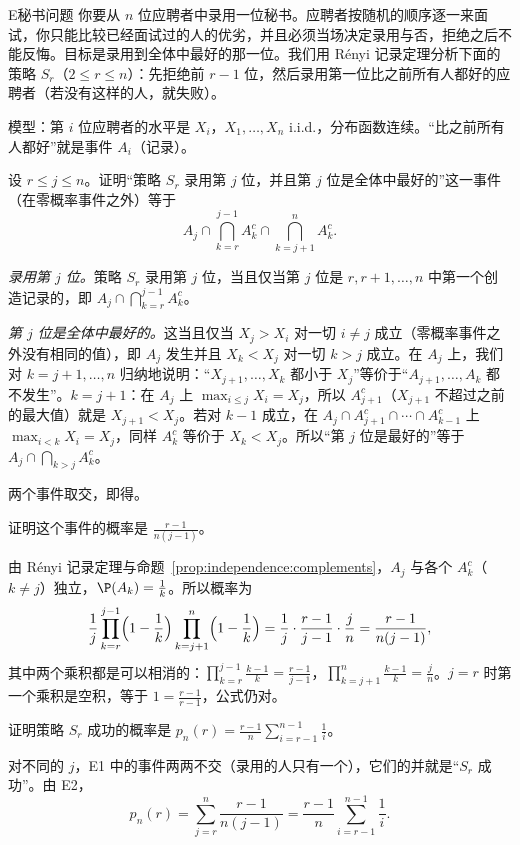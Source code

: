 
\begin{probleme}{E}{秘书问题}
你要从 $n$ 位应聘者中录用一位秘书。应聘者按随机的顺序逐一来面试，你只能比较已经面试过的人的优劣，并且必须当场决定录用与否，拒绝之后不能反悔。目标是录用到全体中最好的那一位。我们用 Rényi 记录定理分析下面的策略 $S_r$（$2\leqslant r\leqslant n$）：先拒绝前 $r-1$ 位，然后录用第一位比之前所有人都好的应聘者（若没有这样的人，就失败）。

模型：第 $i$ 位应聘者的水平是 $X_i$，$X_1,\dots,X_n$ i.i.d.，分布函数连续。“比之前所有人都好”就是事件 $A_i$（记录）。
\begin{questions}
\item 设 $r\leqslant j\leqslant n$。证明“策略 $S_r$ 录用第 $j$ 位，并且第 $j$ 位是全体中最好的”这一事件（在零概率事件之外）等于
\[
A_j\cap\bigcap_{k=r}^{j-1}A_k^c\cap\bigcap_{k=j+1}^nA_k^c .
\]
\begin{solution}
\emph{录用第 $j$ 位。}策略 $S_r$ 录用第 $j$ 位，当且仅当第 $j$ 位是 $r,r+1,\dots,n$ 中第一个创造记录的，即 $A_j\cap\bigcap_{k=r}^{j-1}A_k^c$。

\emph{第 $j$ 位是全体中最好的。}这当且仅当 $X_j>X_i$ 对一切 $i\neq j$ 成立（零概率事件之外没有相同的值），即 $A_j$ 发生并且 $X_k<X_j$ 对一切 $k>j$ 成立。在 $A_j$ 上，我们对 $k=j+1,\dots,n$ 归纳地说明：“$X_{j+1},\dots,X_k$ 都小于 $X_j$”等价于“$A_{j+1},\dots,A_k$ 都不发生”。$k=j+1$：在 $A_j$ 上 $\max_{i\leqslant j}X_i=X_j$，所以 $A_{j+1}^c$（$X_{j+1}$ 不超过之前的最大值）就是 $X_{j+1}<X_j$。若对 $k-1$ 成立，在 $A_j\cap A_{j+1}^c\cap\cdots\cap A_{k-1}^c$ 上 $\max_{i<k}X_i=X_j$，同样 $A_k^c$ 等价于 $X_k<X_j$。所以“第 $j$ 位是最好的”等于 $A_j\cap\bigcap_{k>j}A_k^c$。

两个事件取交，即得。
\end{solution}

\item 证明这个事件的概率是 $\frac{r-1}{n(j-1)}$。
\begin{solution}
由 Rényi 记录定理与命题~\ref{prop:independence:complements}，$A_j$ 与各个 $A_k^c$（$k\neq j$）独立，$\P(A_k)=\frac1k$。所以概率为
\[
\frac1j\prod_{k=r}^{j-1}\Bigl(1-\frac1k\Bigr)\prod_{k=j+1}^n\Bigl(1-\frac1k\Bigr)=\frac1j\cdot\frac{r-1}{j-1}\cdot\frac jn=\frac{r-1}{n(j-1)},
\]
其中两个乘积都是可以相消的：$\prod_{k=r}^{j-1}\frac{k-1}k=\frac{r-1}{j-1}$，$\prod_{k=j+1}^n\frac{k-1}k=\frac jn$。$j=r$ 时第一个乘积是空积，等于 $1=\frac{r-1}{r-1}$，公式仍对。
\end{solution}

\item 证明策略 $S_r$ 成功的概率是 $p_n(r)=\frac{r-1}n\sum_{i=r-1}^{n-1}\frac1i$。
\begin{solution}
对不同的 $j$，E1 中的事件两两不交（录用的人只有一个），它们的并就是“$S_r$ 成功”。由 E2，
\[
p_n(r)=\sum_{j=r}^n\frac{r-1}{n(j-1)}=\frac{r-1}n\sum_{i=r-1}^{n-1}\frac1i .
\]
\end{solution}


\end{questions}
\end{probleme}
